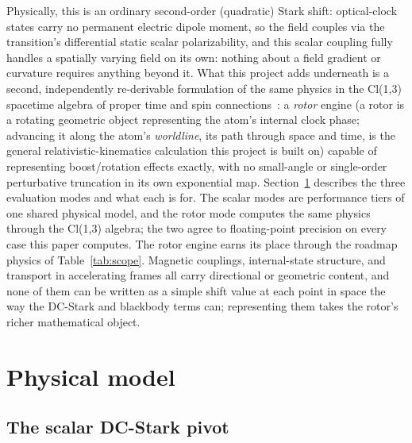 \documentclass[aps,pra,superscriptaddress,groupedaddress,nofootinbib]{revtex4-2}
\begin{document}
Physically, this is an ordinary second-order (quadratic) Stark shift:
optical-clock states carry no permanent electric dipole moment, so the
field couples via the transition's differential static scalar
polarizability, and this scalar coupling
fully handles a spatially varying field on its own: nothing about a
field gradient or curvature requires anything beyond it. What this
project adds underneath is a second, independently re-derivable
formulation of the same physics in the Cl(1,3) spacetime algebra of
proper time and spin connections~\cite{Hestenes2015,DoranLasenby2003}: a
\emph{rotor} engine (a rotor is a rotating geometric object representing
the atom's internal clock phase; advancing it along the atom's
\emph{worldline}, its path through space and time, is the general
relativistic-kinematics calculation this project is built on) capable of
representing boost/rotation effects exactly, with no small-angle or
single-order perturbative truncation in its own exponential map.
Section~\ref{sec:model} describes the three evaluation modes and what
each is for. The scalar modes are performance tiers of one shared
physical model, and the rotor mode computes the same physics through
the Cl(1,3) algebra; the two agree to floating-point precision on every
case this paper computes. The rotor engine earns its place through the
roadmap physics of Table~\ref{tab:scope}. Magnetic couplings,
internal-state structure, and transport in accelerating frames all
carry directional or geometric content, and none of them can be written
as a simple shift value at each point in space the way the DC-Stark and
blackbody terms can; representing them takes the rotor's richer
mathematical object.

\section{Physical model}
\label{sec:model}

\subsection{The scalar DC-Stark pivot}
\label{sec:scalar-pivot}
\end{document}
